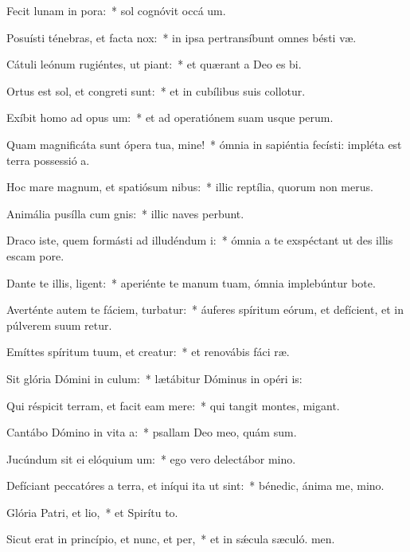 \item Fecit lunam in pora:~* sol cognóvit occá um.
\item Posuísti ténebras, et facta  nox:~* in ipsa pertransíbunt omnes bésti væ.
\item Cátuli leónum rugiéntes, ut piant:~* et quærant a Deo es bi.
\item Ortus est sol, et congreti sunt:~* et in cubílibus suis collotur.
\item Exíbit homo ad opus um:~* et ad operatiónem suam usque  perum.
\item Quam magnificáta sunt ópera tua, mine!~* ómnia in sapiéntia fecísti: impléta est terra possessió a.
\item Hoc mare magnum, et spatiósum nibus:~* illic reptília, quorum non  merus.
\item Animália pusílla cum gnis:~* illic naves perbunt.
\item Draco iste, quem formásti ad illudéndum i:~* ómnia a te exspéctant ut des illis escam  pore.
\item Dante te illis, ligent:~* aperiénte te manum tuam, ómnia implebúntur bote.
\item Averténte autem te fáciem, turbatur:~* áuferes spíritum eórum, et defícient, et in púlverem suum retur.
\item Emíttes spíritum tuum, et creatur:~* et renovábis fáci ræ.
\item Sit glória Dómini in culum:~* lætábitur Dóminus in opéri is:
\item Qui réspicit terram, et facit eam mere:~* qui tangit montes,  migant.
\item Cantábo Dómino in vita a:~* psallam Deo meo, quám sum.
\item Jucúndum sit ei elóquium um:~* ego vero delectábor  mino.
\item Defíciant peccatóres a terra, et iníqui ita ut  sint:~* bénedic, ánima me, mino.
\item Glória Patri, et lio,~* et Spirítu to.
\item Sicut erat in princípio, et nunc, et per,~* et in sǽcula sæculó. men.
